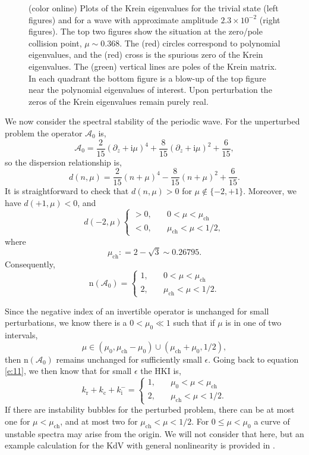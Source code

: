 \documentclass[review,onefignum,onetabnum]{siamart171218}
\def\coloneqq{\mathrel{\mathop:}=}
\newcommand{\rmc}{\mathrm{c}}
\newcommand{\rmi}{\mathrm{i}}
\newcommand{\rmn}{\mathrm{n}}
\newcommand{\rmr}{\mathrm{r}}
\newcommand{\calA}{\mathcal{A}}
\begin{document}
\begin{figure}[ht]
\begin{center}
\begin{tabular}{cc}
\end{tabular}
\caption{(color online) Plots of the Krein eigenvalues for the trivial state (left figures) and for
a wave with approximate amplitude $2.3\times10^{-2}$ (right figures). The top two figures show the
situation at the zero/pole collision
point, $\mu\sim0.368$. The (red) circles correspond to polynomial eigenvalues, and the (red) cross
is the spurious zero of the Krein eigenvalues. The (green) vertical lines are poles
of the Krein matrix. In each quadrant the bottom figure is a blow-up
of the top figure near the polynomial eigenvalues of interest. Upon perturbation the zeros of the Krein eigenvalues remain purely real.}
\label{f:KreinEvalCollide1}
\end{center}
\end{figure}

We now consider the spectral stability of the periodic wave. For the unperturbed problem the operator $\calA_0$ is,
\[
\calA_0=\frac2{15}(\partial_z+\rmi\mu)^4+\frac8{15}(\partial_z+\rmi\mu)^2+\frac6{15},
\]
so the dispersion relationship is,
\[
d(n,\mu)=\frac2{15}(n+\mu)^4-\frac8{15}(n+\mu)^2+\frac6{15}.
\]
It is straightforward to check that $d(n,\mu)>0$ for $\mu\notin\{-2,+1\}$.
Moreover, we have $d(+1,\mu)<0$, and
\[
d(-2,\mu)\begin{cases}>0,\quad&0<\mu<\mu_{\mathrm{ch}}\\
<0,\quad&\mu_{\mathrm{ch}}<\mu<1/2,\end{cases}
\]
where
\[
\mu_{\mathrm{ch}}\coloneqq2-\sqrt{3}\sim0.26795.
\]
Consequently,
\[
\rmn(\calA_0)=\begin{cases}1,\quad&0<\mu<\mu_{\mathrm{ch}}\\
2,\quad&\mu_{\mathrm{ch}}<\mu<1/2.\end{cases}
\]

Since the negative index of an invertible operator is unchanged for small perturbations, we know there is a $0<\mu_0\ll1$ such that if $\mu$ is in one of two intervals, 
\[
\mu\in\left(\mu_0,\mu_{\mathrm{ch}}-\mu_0\right)\cup
\left(\mu_{\mathrm{ch}}+\mu_0,1/2\right),
\]
then $\rmn(\calA_0)$ remains unchanged for sufficiently small $\epsilon$. Going back to equation \cref{e:11}, we then know that for small $\epsilon$ the HKI is,
\[
k_\rmr+k_\rmc+k_\rmi^-=\begin{cases}1,\quad&\mu_0<\mu<\mu_{\mathrm{ch}}\\
2,\quad&\mu_{\mathrm{ch}}<\mu<1/2.\end{cases}
\]
If there are instability bubbles for the perturbed problem, there can be at most one for $\mu<\mu_{\mathrm{ch}}$, and at most two for $\mu_{\mathrm{ch}}<\mu<1/2$. For $0\le\mu<\mu_0$ a curve of unstable spectra may arise from the origin. We will not consider that here, but an example calculation for the KdV with general nonlinearity is provided in \cite[Section~4]{haragus:ots08}.
\end{document}
